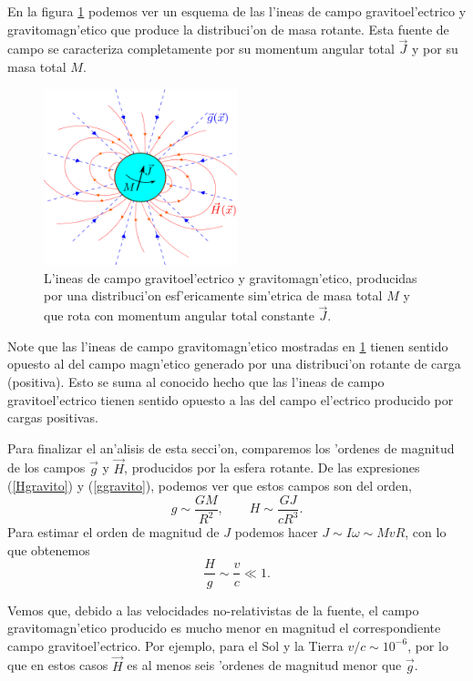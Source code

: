 En la figura \ref{fig:gravitoelectromagnetico} podemos ver un esquema de las l'ineas de campo gravitoel'ectrico y gravitomagn'etico que produce la distribuci'on de masa rotante. Esta fuente de campo se caracteriza completamente por su momentum angular total $\vec{J}$ y por su masa total $M$.
\begin{figure}[H]
\centering
\includegraphics[angle=0,width=0.5\textwidth]{fig/fig-gravitoelectromagnetico.pdf}
\caption{L'ineas de campo gravitoel'ectrico y gravitomagn'etico, producidas por una distribuci'on esf'ericamente sim'etrica de masa total $M$ y que rota con momentum angular total constante $\vec{J}$.}
\label{fig:gravitoelectromagnetico}
\end{figure}

Note que las l'ineas de campo gravitomagn'etico mostradas en \ref{fig:gravitoelectromagnetico} tienen sentido opuesto al del campo magn'etico generado por una distribuci'on rotante de carga (positiva). Esto se suma al conocido hecho que las l'ineas de campo gravitoel'ectrico tienen sentido opuesto a las del campo el'ectrico producido por cargas positivas.

Para finalizar el an'alisis de esta secci'on, comparemos los 'ordenes de magnitud de los campos $\vec{g}$ y $\vec{H}$, producidos por la esfera rotante. De las expresiones (\ref{Hgravito}) y (\ref{ggravito}), podemos ver que estos campos son del orden,
\begin{equation}\label{magg}
g\sim \frac{GM}{R^2}, \qquad H\sim \frac{GJ}{cR^3}.
\end{equation}
Para estimar el orden de magnitud de $J$ podemos hacer $J\sim I\omega\sim MvR$, con lo que obtenemos
\begin{equation}
\frac{H}{g}\sim\frac{v}{c}\ll 1.
\end{equation}

Vemos que, debido a las velocidades no-relativistas de la fuente, el campo gravitomagn'etico producido es mucho menor en magnitud el correspondiente campo gravitoel'ectrico. Por ejemplo, para el Sol y la Tierra $v/c\sim10^{-6}$, por lo que en estos casos $\vec{H}$ es al menos seis 'ordenes de magnitud menor que $\vec{g}$.

